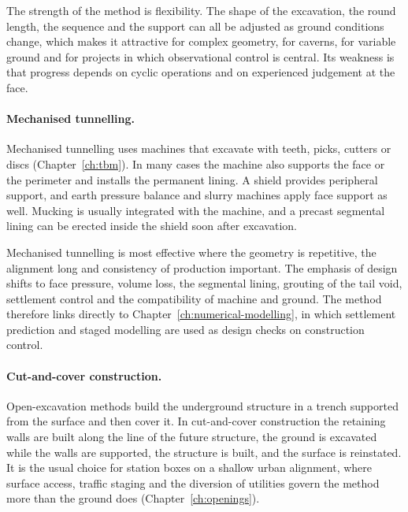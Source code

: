 The strength of the method is flexibility. The shape of the excavation, the
round length, the sequence and the support can all be adjusted as ground
conditions change, which makes it attractive for complex geometry, for
caverns, for variable ground and for projects in which observational control
is central. Its weakness is that progress depends on cyclic operations and on
experienced judgement at the face.

\paragraph{Mechanised tunnelling.}
\label{sec:mechanised-tunnelling}
Mechanised tunnelling uses machines that excavate with teeth, picks, cutters
or discs (Chapter~\ref{ch:tbm}). In many cases the machine also
supports the face or the perimeter and installs the permanent lining. A
shield provides peripheral support, and earth pressure balance and slurry
machines apply face support as well. Mucking is usually integrated with the
machine, and a precast segmental lining can be erected inside the shield soon
after excavation.

Mechanised tunnelling is most effective where the geometry is repetitive, the
alignment long and consistency of production important. The emphasis of
design shifts to face pressure, volume loss, the segmental lining, grouting
of the tail void, settlement control and the compatibility of machine and
ground. The method therefore links directly to
Chapter~\ref{ch:numerical-modelling}, in which settlement prediction and
staged modelling are used as design checks on construction control.

\paragraph{Cut-and-cover construction.}
\label{sec:cut-and-cover}
Open-excavation methods build the underground structure in a trench supported
from the surface and then cover it. In cut-and-cover construction the
retaining walls are built along the line of the future structure, the ground
is excavated while the walls are supported, the structure is built, and the
surface is reinstated. It is the usual choice for station boxes on a shallow
urban alignment, where surface access, traffic staging and the diversion of
utilities govern the method more than the ground does
(Chapter~\ref{ch:openings}).

